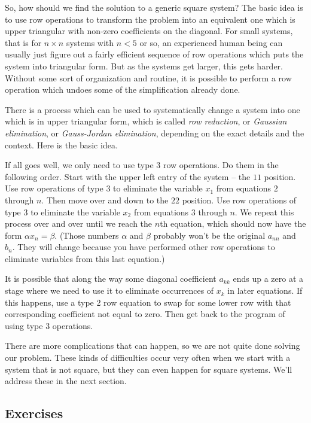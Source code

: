 \documentclass[elementsmain.tex]{subfiles}
\begin{document}
So, how should we find the solution to a generic square system? The basic idea is to use row operations to transform the problem into an equivalent one which is upper triangular with non-zero coefficients on the diagonal. For small systems, that is for $n\times n$ systems with $n < 5$ or so, an experienced human being can usually just figure out a fairly efficient sequence of row operations which puts the system into triangular form. 
But as the systems get larger, this gets harder. Without some sort of organization and routine, it is possible to perform a row operation which undoes some of the simplification already done.

There is a process which can be used to systematically change a system into one which is in upper triangular form, which is called \emph{row reduction}, or \emph{Gaussian elimination}, or \emph{Gauss-Jordan elimination}, depending on the exact details and the context. Here is the basic idea.

If all goes well, we only need to use type 3 row operations. Do them in the following order.
Start with the upper left entry of the system -- the ${11}$ position. Use row operations of type 3 to eliminate the variable $x_1$ from equations $2$ through $n$. Then move over and down to the ${22}$ position. Use row operations of type 3 to eliminate the variable $x_2$ from equations $3$ through $n$. We repeat this process over and over until we reach the $n$th equation, which should now have the form $\alpha x_n = \beta$. (Those numbers $\alpha$ and $\beta$ probably won't be the original $a_{nn}$ and $b_n$. They will change because you have performed other row operations to eliminate variables from this last equation.)

It is possible that along the way some diagonal coefficient $a_{kk}$ ends up a zero at a stage where we need to use it to eliminate occurrences of $x_k$ in later equations. If this happens, use a type 2 row equation to swap for some lower row with that corresponding coefficient not equal to zero. Then get back to the program of using type 3 operations.


There are more complications that can happen, so we are not quite done solving our problem. These kinds of difficulties occur very often when we start with a system that is not square, but they can even happen for square systems. We'll address these in the next section.


\clearpage
\subsection*{Exercises}
\end{document}
